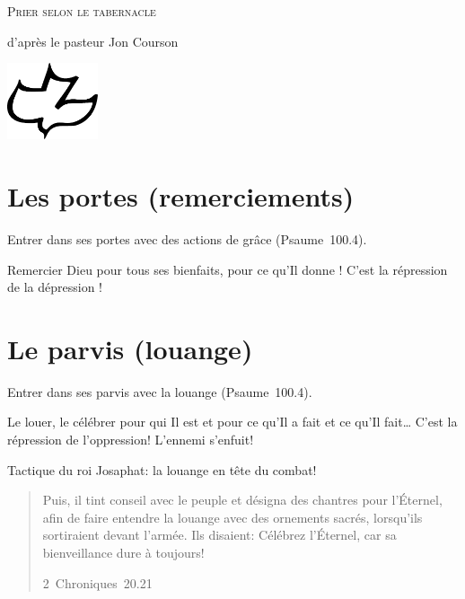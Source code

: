 \begin{center}
\mbox{}

\bigskip

\LARGE\textsc{Prier selon le tabernacle}

\vspace{2ex plus \fill}

\large{d'après le pasteur Jon Courson}

\vspace{3ex plus \fill}

\includegraphics[width=0.2\textwidth]{colombe.pdf}

\vspace{0ex plus \fill}


\mbox{}
\end{center}

\pagestyle{empty}
\setlength{\parindent}{0em}

\section{Les portes (remerciements)}

Entrer dans ses portes avec des actions de grâce (Psaume~100.4).

Remercier Dieu pour tous ses bienfaits, pour ce qu'Il donne ! C'est la \og répression de la dépression \fg{}!

 
\section{Le parvis (louange)}

Entrer dans ses parvis avec la louange (Psaume~100.4).

Le louer, le célébrer pour qui Il est et pour ce qu'Il a fait et ce qu'Il fait\dots{} C'est la répression de l'oppression! L'ennemi s'enfuit!

Tactique du roi Josaphat:  la louange en tête du combat!

\begin{quote}
\og Puis, il tint conseil avec le peuple et désigna des chantres pour l’Éternel, afin de faire entendre la louange avec des ornements sacrés, lorsqu’ils sortiraient devant l’armée. Ils disaient: Célébrez l’Éternel, car sa bienveillance dure à toujours! \fg{}

\raggedleft\small 2~Chroniques~20.21
\end{quote}

